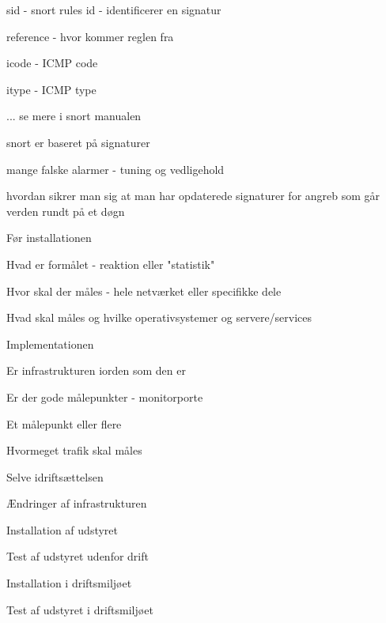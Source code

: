 \begin{list2}
\item sid - snort rules id - identificerer en signatur  
\item reference - hvor kommer reglen fra
\item icode - ICMP code
\item itype - ICMP type
\item ... se mere i snort manualen
\end{list2}



\begin{list1}
\item snort er baseret på signaturer
\item mange falske alarmer - tuning og vedligehold
\item hvordan sikrer man sig at man har opdaterede signaturer for
  angreb som går verden rundt på et døgn 
\end{list1}


\begin{list1}
\item Før installationen
\begin{list2}
\item Hvad er formålet - reaktion eller "statistik"
\item Hvor skal der måles - hele netværket eller specifikke dele
\item Hvad skal måles og hvilke operativsystemer og servere/services
\end{list2}
\item Implementationen
\begin{list2}
\item Er infrastrukturen iorden som den er
\item Er der gode målepunkter - monitorporte
\item Et målepunkt eller flere
\item Hvormeget trafik skal måles
\end{list2}
\item Selve idriftsættelsen
\begin{list2}
\item Ændringer af infrastrukturen
\item Installation af udstyret
\item Test af udstyret udenfor drift
\item Installation i driftsmiljøet
\item Test af udstyret i driftsmiljøet
\end{list2}
\end{list1}

